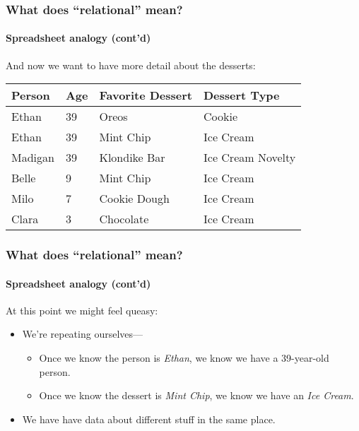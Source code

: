 \documentclass{beamer}
\begin{document}
\begin{frame}
  \frametitle{What does ``relational'' mean?}
  \framesubtitle{Spreadsheet analogy (cont'd)}

  And now we want to have more detail about the desserts:

  \begin{table}[]
    \small
    \begin{tabular}{@{}llll@{}}
      \toprule
      Person  & Age & Favorite Dessert & Dessert Type      \\ \midrule
      Ethan   & 39  & Oreos            & Cookie            \\
      Ethan   & 39  & Mint Chip        & Ice Cream         \\
      Madigan & 39  & Klondike Bar     & Ice Cream Novelty \\
      Belle   & 9   & Mint Chip        & Ice Cream         \\
      Milo    & 7   & Cookie Dough     & Ice Cream         \\
      Clara   & 3   & Chocolate        & Ice Cream         \\ \bottomrule
    \end{tabular}
  \end{table}
\end{frame}

\begin{frame}
  \frametitle{What does ``relational'' mean?}
  \framesubtitle{Spreadsheet analogy (cont'd)}

  At this point we might feel queasy:
  \begin{itemize}
    \item We're repeating ourselves---
          \begin{itemize}
            \item Once we know the person is \textit{Ethan}, we know we have
                  a 39-year-old person.
            \item Once we know the dessert is \textit{Mint Chip}, we know we
                  have an \textit{Ice Cream}.
          \end{itemize}
    \item We have have data about different stuff in the same place.
  \end{itemize}
\end{frame}
\end{document}
